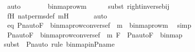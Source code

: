 \begin{isabellebody}
\ auto\isanewline
\ \ \isamarkupfalse%
\ \isamarkupfalse%
\ {\isachardoublequoteopen}{\isachardot}{\kern0pt}{\isachardot}{\kern0pt}{\isachardot}{\kern0pt}\ {\isacharequal}{\kern0pt}\ binmap{\isacharunderscore}{\kern0pt}row{\isacharprime}{\kern0pt}{\isacharparenleft}{\kern0pt}m{\isacharparenright}{\kern0pt}{\isachardoublequoteclose}\ \isanewline
\ \ \ \ \isamarkupfalse%
{\isacharparenleft}{\kern0pt}subst\ right{\isacharunderscore}{\kern0pt}inverse{\isacharunderscore}{\kern0pt}bij{\isacharparenright}{\kern0pt}\isanewline
\ \ \ \ \isamarkupfalse%
\ fH\ nat{\isacharunderscore}{\kern0pt}perms{\isacharunderscore}{\kern0pt}def\ mH\ \isanewline
\ \ \ \ \isamarkupfalse%
\ auto\isanewline
\ \ \isamarkupfalse%
\ \isamarkupfalse%
\ eq{\isacharcolon}{\kern0pt}\ {\isachardoublequoteopen}Pn{\isacharunderscore}{\kern0pt}auto{\isacharparenleft}{\kern0pt}F{\isacharparenright}{\kern0pt}\ {\isacharbackquote}{\kern0pt}\ binmap{\isacharunderscore}{\kern0pt}row{\isacharprime}{\kern0pt}{\isacharparenleft}{\kern0pt}converse{\isacharparenleft}{\kern0pt}f{\isacharparenright}{\kern0pt}\ {\isacharbackquote}{\kern0pt}\ m{\isacharparenright}{\kern0pt}\ {\isacharequal}{\kern0pt}\ binmap{\isacharunderscore}{\kern0pt}row{\isacharprime}{\kern0pt}{\isacharparenleft}{\kern0pt}m{\isacharparenright}{\kern0pt}{\isachardoublequoteclose}\ \isamarkupfalse%
\ simp\isanewline
\isanewline
\ \ \isamarkupfalse%
\ {\isachardoublequoteopen}{\isacharless}{\kern0pt}Pn{\isacharunderscore}{\kern0pt}auto{\isacharparenleft}{\kern0pt}F{\isacharparenright}{\kern0pt}\ {\isacharbackquote}{\kern0pt}\ binmap{\isacharunderscore}{\kern0pt}row{\isacharprime}{\kern0pt}{\isacharparenleft}{\kern0pt}converse{\isacharparenleft}{\kern0pt}f{\isacharparenright}{\kern0pt}\ {\isacharbackquote}{\kern0pt}\ m{\isacharparenright}{\kern0pt}{\isacharcomma}{\kern0pt}\ F{\isacharbackquote}{\kern0pt}{}{\isachargreater}{\kern0pt}\ {\isasymin}\ Pn{\isacharunderscore}{\kern0pt}auto{\isacharparenleft}{\kern0pt}F{\isacharparenright}{\kern0pt}\ {\isacharbackquote}{\kern0pt}\ binmap{\isacharprime}{\kern0pt}{\isachardoublequoteclose}\ \ \isanewline
\ \ \ \ \isamarkupfalse%
{\isacharparenleft}{\kern0pt}subst\ {\isacharparenleft}{\kern0pt}{}{\isacharparenright}{\kern0pt}\ Pn{\isacharunderscore}{\kern0pt}auto{\isacharcomma}{\kern0pt}\ rule\ binmap{\isacharprime}{\kern0pt}{\isacharunderscore}{\kern0pt}in{\isacharunderscore}{\kern0pt}P{\isacharunderscore}{\kern0pt}name{\isacharparenright}{\kern0pt}\isanewline

\end{isabellebody}
